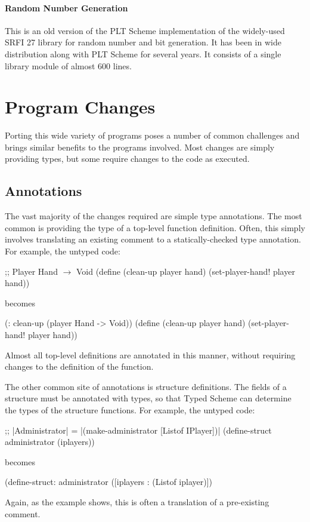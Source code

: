 \begin{schemeregion}
\paragraph{Random Number Generation}
This is an old version of the PLT Scheme implementation of the
widely-used SRFI 27 library for random number and bit generation.  It
has been in wide distribution along with PLT Scheme for several years.
It consists of a single library module of almost 600 lines.

\section{Program Changes}

Porting this wide variety of programs poses a number of common
challenges and brings similar benefits to the programs
involved.  Most changes are simply providing types, but some require
changes to the code as executed.

\subsection{Annotations}

The vast majority of the changes required are simple type annotations.
The most common is providing the type of a top-level function
definition.  Often, this simply involves translating an existing
comment to a statically-checked type annotation.  For example, the
untyped code:

\begin{schemedisplay}
;; Player Hand $\rightarrow$ Void 
(define (clean-up player hand)
  (set-player-hand! player hand))
\end{schemedisplay}
\noindent
becomes 
\begin{schemedisplay}
(: clean-up (player Hand -> Void))
(define (clean-up player hand)
  (set-player-hand! player hand))
\end{schemedisplay}
\noindent
Almost all top-level definitions are annotated in this manner, without
requiring changes to the definition of the function.

The other common site of annotations is structure definitions.  The
fields of a structure must be annotated with types, so that Typed
Scheme can determine the types of the  structure functions.
For example, the untyped code:
\begin{schemedisplay}
;; \scheme|Administrator| = \scheme|(make-administrator [Listof IPlayer])|
(define-struct administrator (iplayers))
\end{schemedisplay}
becomes
\begin{schemedisplay}
(define-struct: administrator ([iplayers : (Listof iplayer)])
\end{schemedisplay}
\noindent
Again, as the example shows, this is often a translation of a
pre-existing comment.


\end{schemeregion}
